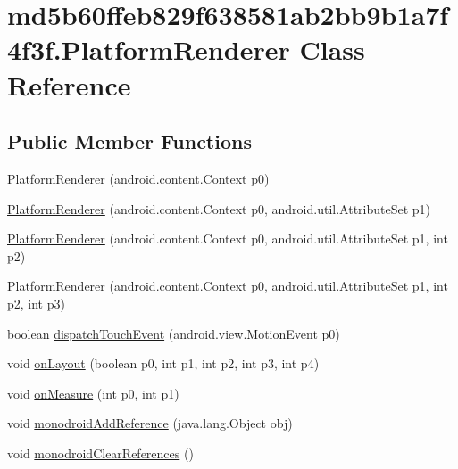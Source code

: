 \hypertarget{classmd5b60ffeb829f638581ab2bb9b1a7f4f3f_1_1_platform_renderer}{
\section{md5b60ffeb829f638581ab2bb9b1a7f4f3f.PlatformRenderer Class Reference}
\label{classmd5b60ffeb829f638581ab2bb9b1a7f4f3f_1_1_platform_renderer}
}
\subsection*{Public Member Functions}
\begin{CompactItemize}
\item 
\hyperlink{classmd5b60ffeb829f638581ab2bb9b1a7f4f3f_1_1_platform_renderer_90bfbb67da58b02ff0166542312af648}{PlatformRenderer} (android.content.Context p0)
\item 
\hyperlink{classmd5b60ffeb829f638581ab2bb9b1a7f4f3f_1_1_platform_renderer_90fc0b6b4826200382896057d7702f7c}{PlatformRenderer} (android.content.Context p0, android.util.AttributeSet p1)
\item 
\hyperlink{classmd5b60ffeb829f638581ab2bb9b1a7f4f3f_1_1_platform_renderer_8177f3eb1c1c90d64ec568241b38a443}{PlatformRenderer} (android.content.Context p0, android.util.AttributeSet p1, int p2)
\item 
\hyperlink{classmd5b60ffeb829f638581ab2bb9b1a7f4f3f_1_1_platform_renderer_e1eb78b8d56f9c8431b1bb5a8cd0f3a6}{PlatformRenderer} (android.content.Context p0, android.util.AttributeSet p1, int p2, int p3)
\item 
boolean \hyperlink{classmd5b60ffeb829f638581ab2bb9b1a7f4f3f_1_1_platform_renderer_3e5da660e483bb06f7cefffd8f570ab8}{dispatchTouchEvent} (android.view.MotionEvent p0)
\item 
void \hyperlink{classmd5b60ffeb829f638581ab2bb9b1a7f4f3f_1_1_platform_renderer_a62ffd461aef9e033818b416eacdac3d}{onLayout} (boolean p0, int p1, int p2, int p3, int p4)
\item 
void \hyperlink{classmd5b60ffeb829f638581ab2bb9b1a7f4f3f_1_1_platform_renderer_08aa31496e02cae4a5b96c1668891094}{onMeasure} (int p0, int p1)
\item 
void \hyperlink{classmd5b60ffeb829f638581ab2bb9b1a7f4f3f_1_1_platform_renderer_35f1c22f204eb1766115df1f3ea8ebf8}{monodroidAddReference} (java.lang.Object obj)
\item 
void \hyperlink{classmd5b60ffeb829f638581ab2bb9b1a7f4f3f_1_1_platform_renderer_1c34b6a1a7883025d993d09095c6ee67}{monodroidClearReferences} ()
\end{CompactItemize}
